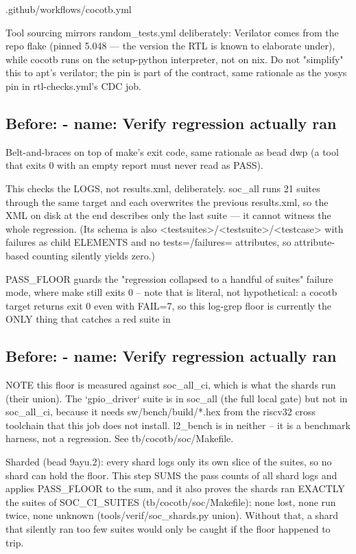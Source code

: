 \begin{relocated}{.github/workflows/cocotb.yml}
\begin{textblock}
Tool sourcing mirrors random_tests.yml deliberately: Verilator comes from the
repo flake (pinned 5.048 — the version the RTL is known to elaborate under),
while cocotb runs on the setup-python interpreter, not on nix. Do not "simplify"
this to apt's verilator; the pin is part of the contract, same rationale as the
yosys pin in rtl-checks.yml's CDC job.
\end{textblock}

\subsection*{Before: - name: Verify regression actually ran}

\begin{textblock}
Belt-and-braces on top of make's exit code, same rationale as bead dwp
(a tool that exits 0 with an empty report must never read as PASS).

This checks the LOGS, not results.xml, deliberately. soc_all runs 21
suites through the same target and each overwrites the previous
results.xml, so the XML on disk at the end describes only the last
suite — it cannot witness the whole regression. (Its schema is also
<testsuites>/<testsuite>/<testcase> with failures as child ELEMENTS and
no tests=/failures= attributes, so attribute-based counting silently
yields zero.)

PASS_FLOOR guards the "regression collapsed to a handful of suites"
failure mode, where make still exits 0 -- note that is literal, not
hypothetical: a cocotb target returns exit 0 even with FAIL=7, so this
log-grep floor is currently the ONLY thing that catches a red suite in
\end{textblock}

\subsection*{Before: - name: Verify regression actually ran}

\begin{textblock}
NOTE this floor is measured against soc_all_ci, which is what the shards
run (their union). The `gpio_driver` suite is in soc_all (the full local gate) but not
in soc_all_ci, because it needs sw/bench/build/*.hex from the riscv32
cross toolchain that this job does not install. l2_bench is in neither --
it is a benchmark harness, not a regression. See tb/cocotb/soc/Makefile.

Sharded (bead 9ayu.2): every shard logs only its own slice of the suites, so no shard can hold
the floor.  This step SUMS the pass counts of all shard logs and applies PASS_FLOOR to the sum,
and it also proves the shards ran EXACTLY the suites of SOC_CI_SUITES (tb/cocotb/soc/Makefile):
none lost, none run twice, none unknown (tools/verif/soc_shards.py union).  Without that, a
shard that silently ran too few suites would only be caught if the floor happened to trip.
\end{textblock}


\end{relocated}
